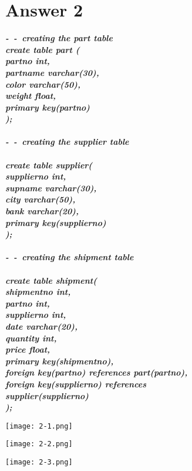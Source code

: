 \documentclass[14pt]{extarticle}
\begin{document}
\section*{Answer 2}
\textbf{\textit{-\ -\ creating the part table \\
create table part (\\
    part\textunderscore no  int,\\
    part\textunderscore name varchar(30),\\
    color varchar(50),\\
    weight float,\\
    primary key(part\textunderscore no)\\
    );\\
\\
-\ -\ creating the supplier table\\
\\
create table supplier(\\
    supplier\textunderscore no int,\\
    sup\textunderscore name    varchar(30),\\
    city varchar(50),\\
    bank varchar(20),\\
    primary key(supplier\textunderscore no)\\
    );
\\
\\
-\ -\ creating the shipment table\\
\\
create table shipment(\\
    shipment\textunderscore no int,\\
    part\textunderscore no int,\\
    supplier\textunderscore no int,\\
    date varchar(20),\\
    quantity  int,\\
    price float,\\
    primary key(shipment\textunderscore no),\\
    foreign key(part\textunderscore no) references part(part\textunderscore no),\\
    foreign key(supplier\textunderscore no) references\\ supplier(supplier\textunderscore no)\\
);}}\\

\begin{center}
    \texttt{[image: 2-1.png]}\\
\end{center}
\begin{center}
    \texttt{[image: 2-2.png]}\\
\end{center}
\begin{center}
    \texttt{[image: 2-3.png]}
\end{center}
\end{document}
